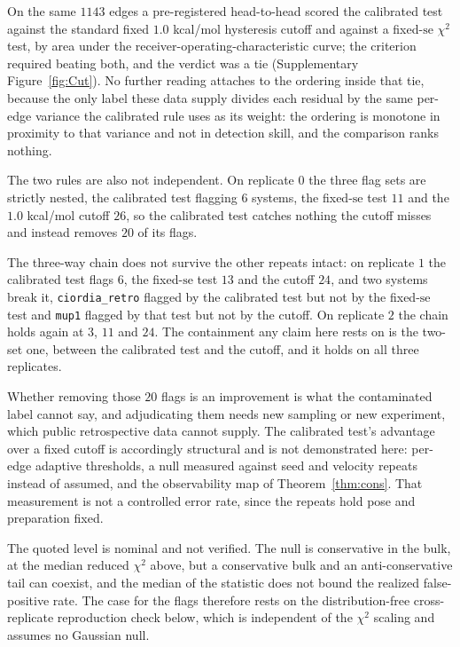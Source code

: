 On the same $1143$ edges a pre-registered head-to-head scored the calibrated test against
the standard fixed $1.0$ kcal/mol hysteresis cutoff and against a fixed-$\mathrm{se}$ $\chi^2$
test, by area under the receiver-operating-characteristic curve; the criterion required beating
both, and the verdict was a tie (Supplementary Figure~\ref{fig:Cut}). No further reading attaches
to the ordering inside that tie, because the only label these data supply divides each residual by
the same per-edge variance the calibrated rule uses as its weight: the ordering is monotone in
proximity to that variance and not in detection skill, and the comparison ranks nothing.

The two rules are also not independent. On replicate $0$ the three flag sets are strictly nested,
the calibrated test flagging $6$ systems, the fixed-$\mathrm{se}$ test $11$ and the $1.0$ kcal/mol
cutoff $26$, so the calibrated test catches nothing the cutoff misses and instead removes $20$ of
its flags.

The three-way chain does not survive the other repeats intact: on replicate $1$ the
calibrated test flags $6$, the fixed-$\mathrm{se}$ test $13$ and the cutoff $24$, and two systems
break it, \texttt{ciordia\_retro} flagged by the calibrated test but not by the fixed-$\mathrm{se}$
test and \texttt{mup1} flagged by that test but not by the cutoff. On replicate $2$ the chain holds
again at $3$, $11$ and $24$. The containment any claim here rests on is the two-set one, between
the calibrated test and the cutoff, and it holds on all three replicates.

Whether removing those $20$ flags is an improvement is what the contaminated label cannot say, and
adjudicating them needs new sampling or new experiment, which public retrospective data cannot
supply. The calibrated test's advantage over a fixed cutoff is accordingly structural and is not
demonstrated here: per-edge adaptive thresholds, a null measured against seed and velocity repeats
instead of assumed, and the observability map of Theorem~\ref{thm:cons}. That measurement is not a
controlled error rate, since the repeats hold pose and preparation fixed.

The quoted level is nominal and not verified. The null is conservative in the bulk, at the median
reduced $\chi^2$ above, but a conservative bulk and an anti-conservative tail can coexist, and the
median of the statistic does not bound the realized false-positive rate. The case for the flags
therefore rests on the distribution-free cross-replicate reproduction check below, which is
independent of the $\chi^2$ scaling and assumes no Gaussian null.

